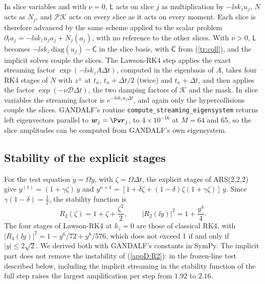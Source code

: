 In slice variables and with $\nu=0$, $\mathsf L$ acts on slice $j$ as multiplication by $-\ii sk_zu_j$, $N$ acts as $N_j$, and $\mathcal P\mathcal K$ acts on every slice as it acts on every moment. Each slice is therefore advanced by the same scheme applied to the scalar problem $\partial_ta_j=-\ii sk_zu_ja_j+N_j(a_j)$, with no reference to the other slices. With $\nu>0$, $\mathsf L$ becomes $-\ii sk_z\,\mathrm{diag}(u_j)-\mathsf C$ in the slice basis, with $\mathsf C$ from (\ref{tr:coll}), and the implicit solves couple the slices. The Lawson-RK4 step applies the exact streaming factor $\exp(-\ii sk_zA\Delta t)$, computed in the eigenbasis of $A$, takes four RK4 stages of $N$ with $z^\pm$ at $t_n$, $t_n+\Delta t/2$ (twice) and $t_n+\Delta t$, and then applies the factor $\exp(-\nu\mathcal D\Delta t)$, the two damping factors of $\mathcal K$ and the mask. In slice variables the streaming factor is $e^{-\ii sk_zu_j\Delta t}$, and again only the hypercollisions couple the slices. GANDALF's routine \texttt{compute\_streaming\_\allowbreak eigensystem} returns left eigenvectors parallel to $\boldsymbol w_j=\Pw\boldsymbol r_j$, to $4\times10^{-16}$ at $M=64$ and 65, so the slice amplitudes can be computed from GANDALF's own eigensystem.

\subsection{Stability of the explicit stages}\label{appD:stab}

For the test equation $\dot y=\Omega y$, with $\zeta=\Omega\Delta t$, the explicit stages of ARS(2,2,2) give $y^{(1)}=(1+\gamma\zeta)\,y$ and $y^{n+1}=[1+\delta\zeta+(1-\delta)\zeta(1+\gamma\zeta)]\,y$. Since $\gamma(1-\delta)=\frac12$, the stability function is
\begin{equation}\label{appD:R2}
  R_2(\zeta)=1+\zeta+\frac{\zeta^2}{2},\qquad |R_2(\ii y)|^2=1+\frac{y^4}{4}.
\end{equation}
The four stages of Lawson-RK4 at $k_z=0$ are those of classical RK4, with $|R_4(\ii y)|^2=1-y^6/72+y^8/576$, which does not exceed 1 if and only if $|y|\le2\sqrt2$. We derived both with GANDALF's constants in SymPy. The implicit part does not remove the instability of (\ref{appD:R2}): in the frozen-line test described below, including the implicit streaming in the stability function of the full step raises the largest amplification per step from $1.92$ to $2.16$.


